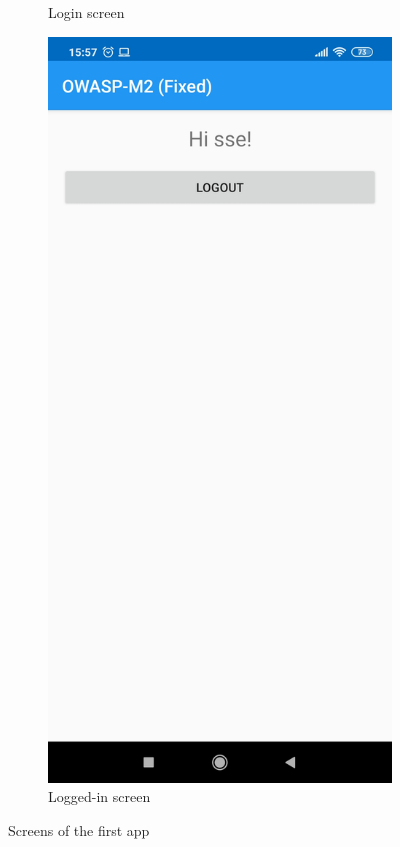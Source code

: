 \begin{figure}[htb!]
\begin{subfigure}{.3\textwidth}
  		\caption{Login screen}
	\end{subfigure}
	\begin{subfigure}{.3\textwidth}
  		\centering
  		\includegraphics[width=\linewidth]{imgs/secure_mobile_programming/app0_logged_in.jpg}
  		\caption{Logged-in screen}
	\end{subfigure}
	\caption{Screens of the first app}
	\label{fig:app0}
\end{figure}


